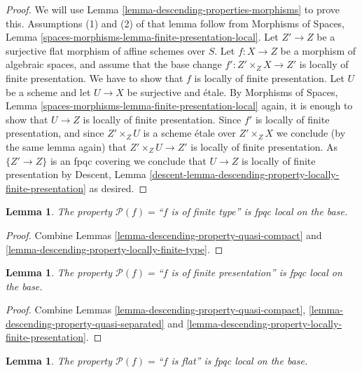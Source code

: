 \documentclass{stacks-project}
\theoremstyle{plain}
\newtheorem{lemma}[subsection]{Lemma}
\theoremstyle{definition}
\theoremstyle{remark}
\numberwithin{equation}{subsection}
\begin{document}
\begin{proof}
We will use
Lemma \ref{lemma-descending-properties-morphisms}
to prove this. Assumptions (1) and (2) of that lemma follow from
Morphisms of Spaces,
Lemma \ref{spaces-morphisms-lemma-finite-presentation-local}.
Let $Z' \to Z$ be a surjective flat morphism of affine schemes over $S$.
Let $f : X \to Z$ be a morphism of algebraic spaces, and assume
that the base change $f' : Z' \times_Z X \to Z'$ is locally of
finite presentation.
We have to show that $f$ is locally of finite presentation. Let $U$ be a scheme
and let $U \to X$ be surjective and \'etale. By
Morphisms of Spaces,
Lemma \ref{spaces-morphisms-lemma-finite-presentation-local}
again, it is enough to show that $U \to Z$ is locally of finite presentation.
Since $f'$ is locally of finite presentation, and since $Z' \times_Z U$ is a
scheme \'etale over $Z' \times_Z X$ we conclude (by the same lemma again) that
$Z' \times_Z U \to Z'$ is locally of finite presentation.
As $\{Z' \to Z\}$ is an fpqc covering we conclude that
$U \to Z$ is locally of finite presentation by
Descent,
Lemma \ref{descent-lemma-descending-property-locally-finite-presentation}
as desired.
\end{proof}

\begin{lemma}
\label{lemma-descending-property-finite-type}
The property $\mathcal{P}(f) =$``$f$ is of finite type''
is fpqc local on the base.
\end{lemma}

\begin{proof}
Combine Lemmas \ref{lemma-descending-property-quasi-compact}
and \ref{lemma-descending-property-locally-finite-type}.
\end{proof}

\begin{lemma}
\label{lemma-descending-property-finite-presentation}
The property $\mathcal{P}(f) =$``$f$ is of finite presentation''
is fpqc local on the base.
\end{lemma}

\begin{proof}
Combine Lemmas \ref{lemma-descending-property-quasi-compact},
\ref{lemma-descending-property-quasi-separated} and
\ref{lemma-descending-property-locally-finite-presentation}.
\end{proof}

\begin{lemma}
\label{lemma-descending-property-flat}
The property $\mathcal{P}(f) =$``$f$ is flat''
is fpqc local on the base.
\end{lemma}
\end{document}
